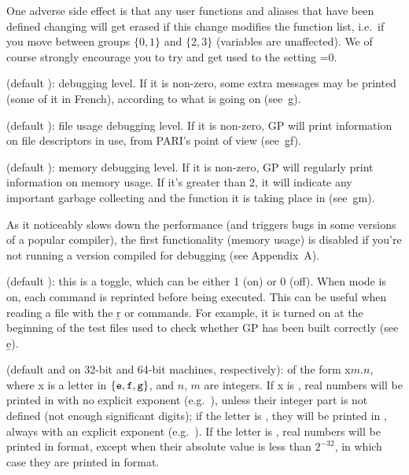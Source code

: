 One adverse side effect is that any user functions and aliases that have
been defined  changing  will get erased if this
change modifies the function list, i.e.~if you move between groups
$\{0,1\}$ and $\{2,3\}$ (variables are unaffected). We of course strongly
encourage you to try and get used to the setting =0.

 (default ): debugging level. If it is non-zero,
some extra messages may be printed (some of it in French), according to
what is going on (see~\b{g}).

 (default ): file usage debugging level. If it
is non-zero, GP will print information on file descriptors in use, from
PARI's point of view (see~\b{gf}).

 (default ): memory debugging level. If it is
non-zero, GP will regularly print information on memory usage. If it's
greater than 2, it will indicate any important garbage collecting and the
function it is taking place in (see~\b{gm}).

 As it noticeably slows down the performance
(and triggers bugs in some versions of a popular compiler), the first
functionality (memory usage) is disabled if you're not running a version
compiled for debugging (see Appendix~A).

 (default ): this is a toggle, which can be either 1
(on) or 0 (off). When  mode is on, each command is reprinted before
being executed. This can be useful when reading a file with the \b{r} or
 commands. For example, it is turned on at the beginning of the test
files used to check whether GP has been built correctly (see \b{e}).

 (default  and  on 32-bit and
64-bit machines, respectively): of the form x$m.n$, where x is a letter in
$\{{\tt e},{\tt f},{\tt g}\}$, and $n$, $m$ are integers. If x is ,
real numbers will be printed in  with no
explicit exponent (e.g.~), unless their integer part is not
defined (not enough significant digits); if the letter is , they
will be printed in , always with an explicit
exponent (e.g.~). If the letter is , real numbers will
be printed in  format, except when their absolute value is less than
$2^{-32}$, in which case they are printed in  format.
\label{se:format}

